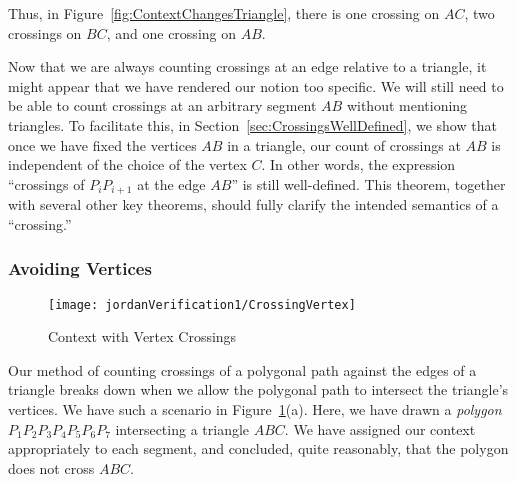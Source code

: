 Thus, in Figure~\ref{fig:ContextChangesTriangle}, there is one crossing on $AC$, two crossings on $BC$, and one crossing on $AB.$

Now that we are always counting crossings at an edge relative to a triangle, it might appear that we have rendered our notion too specific. We will still need to be able to count crossings at an arbitrary segment $AB$ without mentioning triangles. To facilitate this, in Section~\ref{sec:CrossingsWellDefined}, we show that once we have fixed the vertices $AB$ in a triangle, our count of crossings at $AB$ is independent of the choice of the vertex $C$. In other words, the expression ``crossings of $P_iP_{i+1}$ at the edge $AB$'' is still well-defined. This theorem, together with several other key theorems, should fully clarify the intended semantics of a ``crossing.''

\subsubsection{Avoiding Vertices}\label{sec:EdgeCases}

\begin{figure}
\centering\texttt{[image: jordanVerification1/CrossingVertex]}
\caption{Context with Vertex Crossings}
\label{fig:CrossingVertex}
\end{figure}

Our method of counting crossings of a polygonal path against the edges of a triangle breaks down when we allow the polygonal path to intersect the triangle's vertices. We have such a scenario in Figure~\ref{fig:CrossingVertex}(a). Here, we have drawn a \emph{polygon} $P_1P_2P_3P_4P_5P_6P_7$ intersecting a triangle $ABC$. We have assigned our context appropriately to each segment, and concluded, quite reasonably, that the polygon does not cross $ABC$. 

